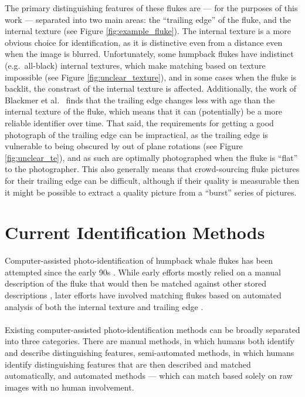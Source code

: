 The primary distinguishing features of these flukes are --- for the purposes of this work --- separated into two main areas: the ``trailing edge'' of the fluke, and the internal texture (see Figure \ref{fig:example_fluke}).
The internal texture is a more obvious choice for identification, as it is distinctive even from a distance even when the image is blurred.
Unfortunately, some humpback flukes have indistinct (e.g.\ all-black) internal textures, which make matching based on texture impossible (see Figure \ref{fig:unclear_texture}), and in some cases when the fluke is backlit, the constrast of the internal texture is affected.
Additionally, the work of Blackmer et al.\ \cite{blackmer2000temporal} finds that the trailing edge changes less with age than the internal texture of the fluke, which means that it can (potentially) be a more reliable identifier over time.
That said, the requirements for getting a good photograph of the trailing edge can be impractical, as the trailing edge is vulnerable to being obscured by out of plane rotations (see Figure \ref{fig:unclear_te}), and as such are optimally photographed when the fluke is ``flat'' to the photographer.
This also generally means that crowd-sourcing fluke pictures for their trailing edge can be difficult, although if their quality is measurable then it might be possible to extract a quality picture from a ``burst'' series of pictures.

\section{Current Identification Methods}

Computer-assisted photo-identification of humpback whale flukes has been attempted since the early 90s \cite{mizroch1990computer}.
While early efforts mostly relied on a manual description of the fluke that would then be matched against other stored descriptions \cite{mizroch1990computer, whitehead1990computer}, later efforts have involved matching flukes based on automated analysis of both the internal texture and trailing edge \cite{hughes2015automated, kniest2010fluke, i3scontour}.
\\\\
Existing computer-assisted photo-identification methods can be broadly separated into three categories.
There are manual methods, in which humans both identify and describe distinguishing features, semi-automated methods, in which humans identify distinguishing features that are then described and matched automatically, and automated methods --- which can match based solely on raw images with no human involvement. 


